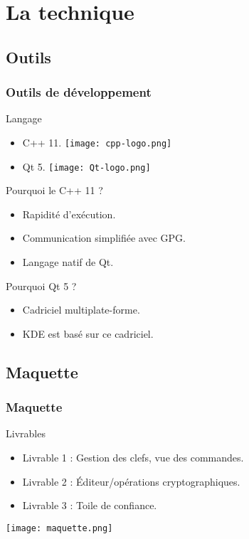 \section{La technique}

\subsection{Outils}
\begin{frame}
  \frametitle{\color{white} Outils de développement}
  \begin{block}{Langage}
    \begin{itemize}
      \item C++ 11.
      \hfill
      \texttt{[image: cpp-logo.png]}
      \item Qt 5.
      \hfill
      \texttt{[image: Qt-logo.png]}
    \end{itemize}
  \end{block}
  \begin{block}{Pourquoi le C++ 11 ?}
    \begin{itemize}
      \item Rapidité d'exécution.
      \item Communication simplifiée avec GPG.
      \item Langage natif de Qt.
    \end{itemize}
  \end{block}
  \begin{block}{Pourquoi Qt 5 ?}
    \begin{itemize}
      \item Cadriciel multiplate-forme.
      \item KDE est basé sur ce cadriciel.
    \end{itemize}
  \end{block}
\end{frame}

\subsection{Maquette}
\begin{frame}
  \frametitle{\color{white} Maquette}
  \begin{block}{Livrables}
    \begin{itemize}
      \item Livrable 1 : Gestion des clefs, vue des commandes.
      \item Livrable 2 : Éditeur/opérations cryptographiques.
      \item Livrable 3 : Toile de confiance.
    \end{itemize}
  \end{block}
  \begin{center}
    \texttt{[image: maquette.png]}
  \end{center}
\end{frame}

